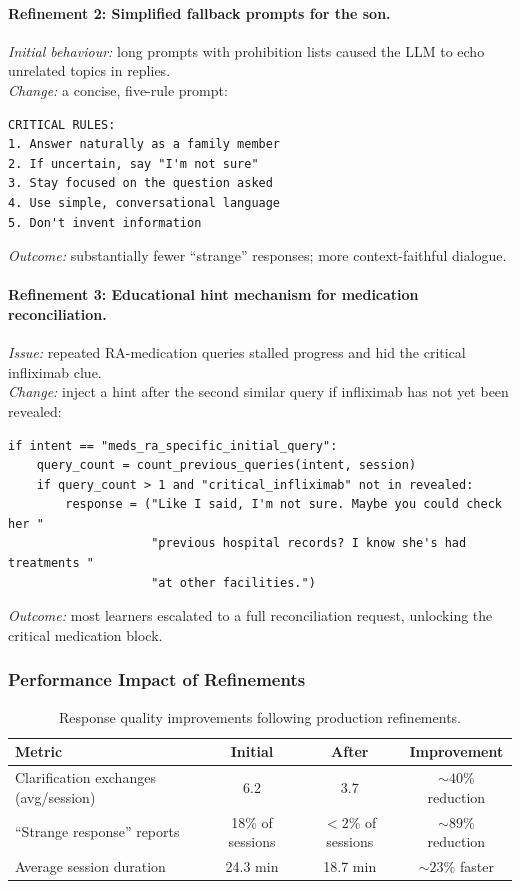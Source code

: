\paragraph{Refinement 2: Simplified fallback prompts for the son.}
\emph{Initial behaviour:} long prompts with prohibition lists caused the LLM to
echo unrelated topics in replies. \\
\emph{Change:} a concise, five-rule prompt:
\begin{verbatim}
CRITICAL RULES:
1. Answer naturally as a family member
2. If uncertain, say "I'm not sure"
3. Stay focused on the question asked
4. Use simple, conversational language
5. Don't invent information
\end{verbatim}
\emph{Outcome:} substantially fewer ``strange'' responses; more context-faithful
dialogue.

\paragraph{Refinement 3: Educational hint mechanism for medication reconciliation.}
\emph{Issue:} repeated RA-medication queries stalled progress and hid the
critical infliximab clue. \\
\emph{Change:} inject a hint after the second similar query if infliximab has
not yet been revealed:
\begin{verbatim}
if intent == "meds_ra_specific_initial_query":
    query_count = count_previous_queries(intent, session)
    if query_count > 1 and "critical_infliximab" not in revealed:
        response = ("Like I said, I'm not sure. Maybe you could check her "
                    "previous hospital records? I know she's had treatments "
                    "at other facilities.")
\end{verbatim}
\emph{Outcome:} most learners escalated to a full reconciliation request,
unlocking the critical medication block.

\subsubsection{Performance Impact of Refinements}

\begin{table}[h]
\centering
\caption{Response quality improvements following production refinements.}
\label{tab:refinement_metrics}
\setlength{\tabcolsep}{6pt}
\renewcommand{\arraystretch}{1.12}
\begin{tabular}{p{6.2cm} c c c}
\toprule
\textbf{Metric} & \textbf{Initial} & \textbf{After} & \textbf{Improvement} \\
\midrule
Clarification exchanges (avg/session) & 6.2 & 3.7 & \(\sim 40\%\) reduction \\
``Strange response'' reports & 18\% of sessions & $<2$\% of sessions & \(\sim 89\%\) reduction \\
Average session duration & 24.3 min & 18.7 min & \(\sim 23\%\) faster \\
\bottomrule
\end{tabular}
\end{table}

